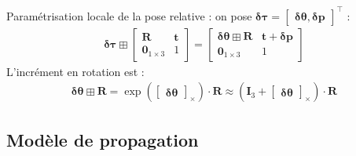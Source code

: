 \documentclass[a4paper]{article}
\begin{document}
\noindent Paramétrisation locale de la pose relative : on pose $\bm{\delta\tau} = \begin{bmatrix} \bm{\delta\theta}, \bm{\delta{p}} \end{bmatrix}^{\top}$ :
\begin{align}
\bm{\delta\tau} \boxplus \begin{bmatrix} \bm{R} & \bm{t} \\ \bm{0}_{1\times{3}} & 1 \end{bmatrix} =
\begin{bmatrix} \bm{\delta\theta} \boxplus \bm{R} & \bm{t} + \bm{\delta{p}} \\ \bm{0}_{1\times{3}} & 1 \end{bmatrix}
\end{align}
L'incrément en rotation est :
\begin{align}
\bm{\delta\theta} \boxplus \bm{R} = \exp\left(\begin{bmatrix}\bm{\delta\theta}\end{bmatrix}_{\times}\right) \cdot \bm{R}
\approx \left( \bm{I}_3 + \begin{bmatrix} \bm{\delta\theta} \end{bmatrix}_{\times} \right) \cdot \bm{R}
\end{align}

\subsection{Modèle de propagation}
\end{document}
